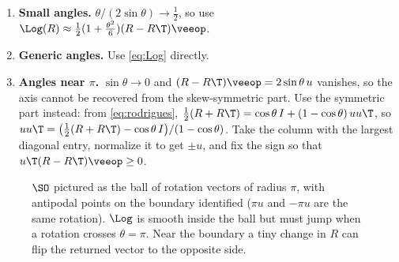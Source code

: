 \begin{enumerate}
  \item \textbf{Small angles.} $\theta/(2\sin\theta) \to \tfrac12$, so use
        $\Log(R) \approx \tfrac12(1 + \tfrac{\theta^2}{6})(R - R\T)\veeop$.
  \item \textbf{Generic angles.} Use \eqref{eq:Log} directly.
  \item \textbf{Angles near $\pi$.} $\sin\theta \to 0$ and $(R - R\T)\veeop = 2\sin\theta\,u$ vanishes, so
        the axis cannot be recovered from the skew-symmetric part. Use the symmetric part instead: from
        \eqref{eq:rodrigues}, $\tfrac12(R + R\T) = \cos\theta\,I + (1-\cos\theta)\,uu\T$, so
        $uu\T = \big(\tfrac12(R + R\T) - \cos\theta\, I\big)/(1 - \cos\theta)$. Take the column with the largest
        diagonal entry, normalize it to get $\pm u$, and fix the sign so that $u\T(R - R\T)\veeop \ge 0$.
\end{enumerate}

\begin{figure}[t]
\centering
{}
\caption{$\SO$ pictured as the ball of rotation vectors of radius $\pi$, with antipodal points on the
boundary identified ($\pi u$ and $-\pi u$ are the same rotation). $\Log$ is smooth inside the ball but
must jump when a rotation crosses $\theta = \pi$. Near the boundary a tiny change in $R$ can flip the
returned vector to the opposite side.}
\label{fig:so3-ball}
\end{figure}

